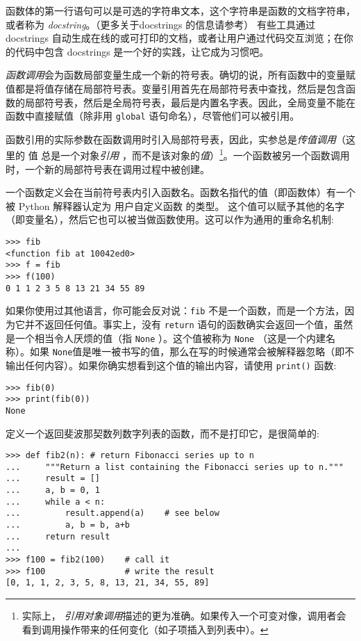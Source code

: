 函数体的第一行语句可以是可选的字符串文本，这个字符串是函数的文档字符串，或者称为 \emph{docstring}。（更多关于docstrings 的信息请参考） 有些工具通过 docstrings 自动生成在线的或可打印的文档，或者让用户通过代码交互浏览；在你的代码中包含 docstrings 是一个好的实践，让它成为习惯吧。

\emph{函数调用}会为函数局部变量生成一个新的符号表。确切的说，所有函数中的变量赋值都是将值存储在局部符号表。变量引用首先在局部符号表中查找，然后是包含函数的局部符号表，然后是全局符号表，最后是内置名字表。因此，全局变量不能在函数中直接赋值（除非用 \texttt{global} 语句命名），尽管他们可以被引用。

函数引用的实际参数在函数调用时引入局部符号表，因此，实参总是\emph{传值调用}（这里的 值 总是一个对象\emph{引用 }，而不是该对象的\emph{值}）\footnote{实际上， \emph{引用对象调用}描述的更为准确。如果传入一个可变对像，调用者会看到调用操作带来的任何变化（如子项插入到列表中）。}。一个函数被另一个函数调用时，一个新的局部符号表在调用过程中被创建。

一个函数定义会在当前符号表内引入函数名。函数名指代的值（即函数体）有一个被 Python 解释器认定为 用户自定义函数 的类型。 这个值可以赋予其他的名字（即变量名），然后它也可以被当做函数使用。这可以作为通用的重命名机制:
\begin{lstlisting}
>>> fib
<function fib at 10042ed0>
>>> f = fib
>>> f(100)
0 1 1 2 3 5 8 13 21 34 55 89
\end{lstlisting}

如果你使用过其他语言，你可能会反对说：\texttt{fib} 不是一个函数，而是一个方法，因为它并不返回任何值。事实上，没有 \texttt{return} 语句的函数确实会返回一个值，虽然是一个相当令人厌烦的值（指 \texttt{None} ）。这个值被称为 \texttt{None} （这是一个内建名称）。如果 \texttt{None}值是唯一被书写的值，那么在写的时候通常会被解释器忽略（即不输出任何内容）。如果你确实想看到这个值的输出内容，请使用 \texttt{print()} 函数:
\begin{lstlisting}
>>> fib(0)
>>> print(fib(0))
None
\end{lstlisting}
定义一个返回斐波那契数列数字列表的函数，而不是打印它，是很简单的:
\begin{lstlisting}
>>> def fib2(n): # return Fibonacci series up to n
...     """Return a list containing the Fibonacci series up to n."""
...     result = []
...     a, b = 0, 1
...     while a < n:
...         result.append(a)    # see below
...         a, b = b, a+b
...     return result
...
>>> f100 = fib2(100)    # call it
>>> f100                # write the result
[0, 1, 1, 2, 3, 5, 8, 13, 21, 34, 55, 89]
\end{lstlisting}

